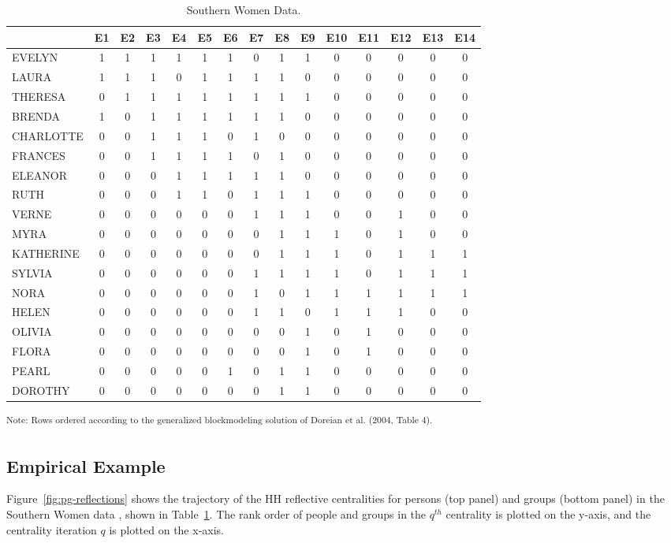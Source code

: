 \documentclass[a4paper,fleqn]{cas-sc}
\begin{document}
\begin{table}
\caption{Southern Women Data.}
\label{tab:southern}
\begin{tabular}[]{lcccccccccccccc}
\hline
 & E1 & E2 & E3 & E4 & E5 & E6 & E7 & E8 & E9 & E10 & E11 & E12 & E13 & E14 \\
 \hline
EVELYN & 1 & 1 & 1 & 1 & 1 & 1 & 0 & 1 & 1 & 0 & 0 & 0 & 0 & 0 \\
LAURA & 1 & 1 & 1 & 0 & 1 & 1 & 1 & 1 & 0 & 0 & 0 & 0 & 0 & 0 \\
THERESA & 0 & 1 & 1 & 1 & 1 & 1 & 1 & 1 & 1 & 0 & 0 & 0 & 0 & 0 \\
BRENDA & 1 & 0 & 1 & 1 & 1 & 1 & 1 & 1 & 0 & 0 & 0 & 0 & 0 & 0 \\
CHARLOTTE & 0 & 0 & 1 & 1 & 1 & 0 & 1 & 0 & 0 & 0 & 0 & 0 & 0 & 0 \\
FRANCES & 0 & 0 & 1 & 1 & 1 & 1 & 0 & 1 & 0 & 0 & 0 & 0 & 0 & 0 \\
ELEANOR & 0 & 0 & 0 & 1 & 1 & 1 & 1 & 1 & 0 & 0 & 0 & 0 & 0 & 0 \\
RUTH & 0 & 0 & 0 & 1 & 1 & 0 & 1 & 1 & 1 & 0 & 0 & 0 & 0 & 0 \\
VERNE & 0 & 0 & 0 & 0 & 0 & 0 & 1 & 1 & 1 & 0 & 0 & 1 & 0 & 0 \\
MYRA & 0 & 0 & 0 & 0 & 0 & 0 & 0 & 1 & 1 & 1 & 0 & 1 & 0 & 0 \\
KATHERINE & 0 & 0 & 0 & 0 & 0 & 0 & 0 & 1 & 1 & 1 & 0 & 1 & 1 & 1 \\
SYLVIA & 0 & 0 & 0 & 0 & 0 & 0 & 1 & 1 & 1 & 1 & 0 & 1 & 1 & 1 \\
NORA & 0 & 0 & 0 & 0 & 0 & 0 & 1 & 0 & 1 & 1 & 1 & 1 & 1 & 1 \\
HELEN & 0 & 0 & 0 & 0 & 0 & 0 & 1 & 1 & 0 & 1 & 1 & 1 & 0 & 0 \\
OLIVIA & 0 & 0 & 0 & 0 & 0 & 0 & 0 & 0 & 1 & 0 & 1 & 0 & 0 & 0 \\
FLORA & 0 & 0 & 0 & 0 & 0 & 0 & 0 & 0 & 1 & 0 & 1 & 0 & 0 & 0 \\
PEARL & 0 & 0 & 0 & 0 & 0 & 1 & 0 & 1 & 1 & 0 & 0 & 0 & 0 & 0 \\
DOROTHY & 0 & 0 & 0 & 0 & 0 & 0 & 0 & 1 & 1 & 0 & 0 & 0 & 0 & 0 \\
\hline
\end{tabular}
\textsuperscript{Note: Rows ordered according to the generalized
blockmodeling solution of Doreian et al. (2004, Table 4).} \\
\end{table}

\subsection{Empirical Example} \label{subsec:ex}
Figure~\ref{fig:pg-reflections} shows the trajectory of the HH reflective centralities for persons (top panel) and groups (bottom panel) in the Southern Women data \citep{davis1941}, shown in Table~\ref{tab:southern}. The rank order of people and groups in the $q^{th}$ centrality is plotted on the y-axis, and the centrality iteration $q$ is plotted on the x-axis.
\end{document}

